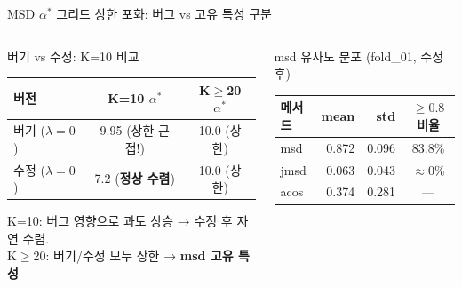 \documentclass[aspectratio=169,10pt]{beamer}
\begin{document}
\begin{frame}[shrink=10]{MSD $\alpha^*$ 그리드 상한 포화: 버그 vs 고유 특성 구분}
	\begin{columns}[T]
			\begin{alertblock}{버기 vs 수정: K=10 비교}
				\small
				\begin{tabular}{l|cc}
					\toprule
					버전 & K=10 $\alpha^*$ & K$\geq$20 $\alpha^*$ \\
					\midrule
					버기 ($\lambda=0$) & 9.95 (상한 근접!) & 10.0 (상한) \\
					수정 ($\lambda=0$) & 7.2 (\textbf{정상 수렴}) & 10.0 (상한) \\
					\bottomrule
				\end{tabular}
				\vspace{0.3em}
				\small K=10: 버그 영향으로 과도 상승 → 수정 후 자연 수렴.\\K$\geq$20: 버기/수정 모두 상한 → \textbf{msd 고유 특성}
			\end{alertblock}

			\begin{block}{msd 유사도 분포 (fold\_01, 수정 후)}
				\small
				\begin{tabular}{l|rrc}
					\toprule
					메서드 & mean & std & $\geq 0.8$ 비율 \\
					\midrule
					msd  & 0.872 & 0.096 & 83.8\% \\
					jmsd & 0.063 & 0.043 & $\approx$0\% \\
					acos & 0.374 & 0.281 & — \\
					\bottomrule
				\end{tabular}
			\end{block}


\end{columns}
\end{frame}
\end{document}
